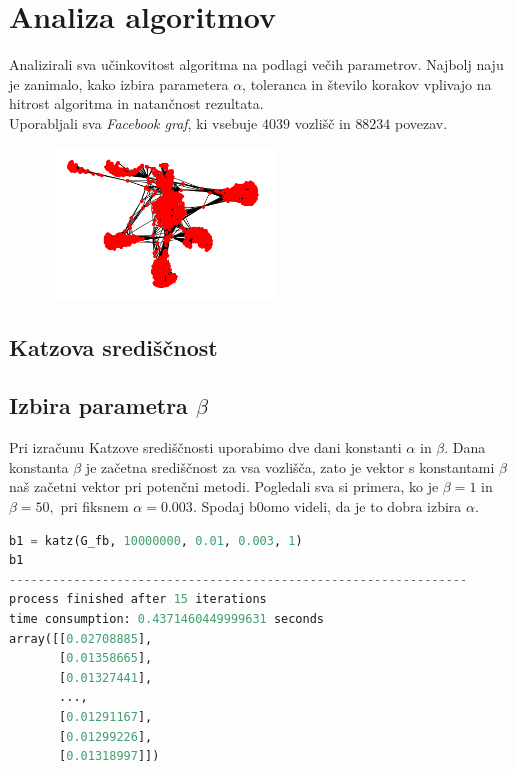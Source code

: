 \documentclass[a4paper]{article}
\begin{document}
\section{Analiza algoritmov}
\hspace{4.8mm}Analizirali sva učinkovitost algoritma na podlagi večih parametrov. Najbolj naju je zanimalo, kako izbira parametera $\alpha$, toleranca in število korakov vplivajo na hitrost algoritma in natančnost rezultata. \\
Uporabljali sva \textit{Facebook graf}, ki vsebuje $4039$ vozlišč in $88234$ povezav.
\begin{figure}[h]
\begin{center} 
\includegraphics[width=6cm]{Facebook_graph.png}
\end{center}
\end{figure}

\subsection{Katzova središčnost}
\subsection{Izbira parametra $\beta$}
\hspace{4.8mm}Pri izračunu Katzove središčnosti uporabimo dve dani konstanti $\alpha$ in $\beta.$ Dana konstanta $\beta$ je začetna središčnost za vsa vozlišča, zato je vektor s konstantami $\beta$ naš začetni vektor pri potenčni metodi. Pogledali sva si primera, ko je $\beta =1$ in $\beta =50,$ pri fiksnem $\alpha = 0.003$. Spodaj b0omo videli, da je to dobra izbira $\alpha.$

\begin{lstlisting}[language=Python]
b1 = katz(G_fb, 10000000, 0.01, 0.003, 1)
b1
----------------------------------------------------------------
process finished after 15 iterations
time consumption: 0.4371460449999631 seconds
array([[0.02708885],
       [0.01358665],
       [0.01327441],
       ...,
       [0.01291167],
       [0.01299226],
       [0.01318997]])
\end{lstlisting}
\end{document}
